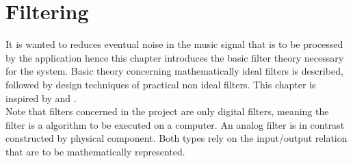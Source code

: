 \chapter{Filtering} \label{ch8}
It is wanted to reduces eventual noise in the music signal that is to be processed by the application hence this chapter introduces the basic filter theory necessary for the system. Basic theory concerning mathematically ideal filters is described, followed by design techniques of practical non ideal filters. This chapter is inspired by \cite{DTSP, ch. 5,7} and \cite{FSP, sec. 3.4.4}. \\
Note that filters concerned in the project are only digital filters, meaning the filter is a algorithm to be executed on a computer. An analog filter is in contrast constructed by physical component. Both types rely on the input/output relation that are to be mathematically represented.




